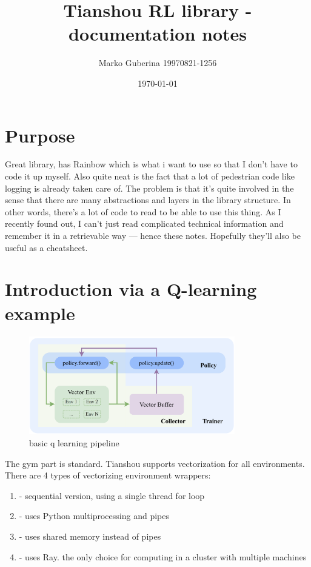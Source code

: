 \documentclass{article}
\title{Tianshou RL library - documentation notes}
\date{\today}
\author{Marko Guberina 19970821-1256}
\begin{document}
\maketitle
\section{Purpose}
Great library, has Rainbow which is what i want to use so that I don't have to code it up myself.
Also quite neat is the fact that a lot of pedestrian code like logging is already taken care of.
The problem is that it's quite involved in the sense that there are many abstractions and layers
in the library structure.
In other words, there's a lot of code to read to be able to use this thing.
As I recently found out, I can't just read complicated technical information and
remember it in a retrievable way --- hence these notes.
Hopefully they'll also be useful as a cheatsheet.

\section{Introduction via a Q-learning example}
\begin{figure}[htpb]
		\centering
		\includegraphics[width=0.8\textwidth]{"./basic_q_learning_pipeline.png"}
		\caption{basic q learning pipeline}
\end{figure}

The gym part is standard.
Tianshou supports vectorization for all environments. There are 4 types
of vectorizing environment wrappers:
\begin{enumerate}
		\item {} - sequential version, using a single thread for loop
		\item {} - uses Python multiprocessing and pipes
		\item {} - uses shared memory instead of pipes
		\item {} - uses Ray. the only choice for computing in a cluster with multiple machines
\end{enumerate}
\end{document}
